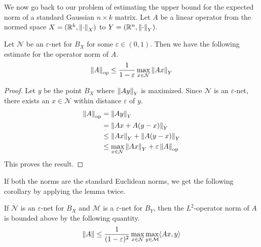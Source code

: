\documentclass[11pt]{article}
\begin{document}
We now go back to our problem of estimating the upper bound for the expected norm of a standard Gaussian $n \times k$ matrix.
Let $A$ be a linear operator from the normed space $X = (\mathbb{R}^k, \left\lVert\cdot\right\rVert_X)$ to $Y = \left( \mathbb{R}^n, \left\lVert\cdot\right\rVert_Y \right)$.
\begin{lemma}
  Let $\mathcal{N}$ be an $\varepsilon$-net for $B_X$ for some $\varepsilon \in (0,1)$.
  Then we have the following estimate for the operator norm of $A$.
  \begin{align*}
    \left\lVert A\right\rVert_{\mathrm{op}} \leq \frac{1}{1 - \varepsilon} \max_{x \in \mathcal{N}} \left\lVert Ax\right\rVert_Y
  \end{align*}
\end{lemma}
\begin{proof}
  Let $y$ be the point $B_X$ where $\left\lVert Ay\right\rVert_Y$ is maximized.
  Since $\mathcal{N}$ is an $\varepsilon$-net, there exists an $x \in \mathcal{N}$ within distance $\varepsilon$ of $y$.
  \begin{align*}
    \left\lVert A\right\rVert_{\mathrm{op}} &= \left\lVert Ay\right\rVert_Y \\
                           &= \left\lVert Ax + A(y-x)\right\rVert_Y \\
                           &\leq \left\lVert Ax\right\rVert_Y + \left\lVert A(y-x)\right\rVert_Y \\
                           &\leq \max_{x \in \mathcal{N}} \left\lVert Ax\right\rVert_Y + \varepsilon \left\lVert A\right\rVert_{\mathrm{op}}
  \end{align*}
  This proves the result.
\end{proof}
If both the norms are the standard Euclidean norms, we get the following corollary by applying the lemma twice.
\begin{corollary}
  If $\mathcal{N}$ is an $\varepsilon$-net for $B_X$ and $\mathcal{M}$ is a $\varepsilon$-net for $B_Y$, then the $L^2$-operator norm of $A$ is bounded above by the following quantity.
  \begin{align*}
    \left\lVert A\right\rVert \leq \frac{1}{(1-\varepsilon)^2} \max_{x \in \mathcal{N}} \max_{y \in \mathcal{M}} \langle Ax, y \rangle
  \end{align*}
\end{corollary}
\end{document}
